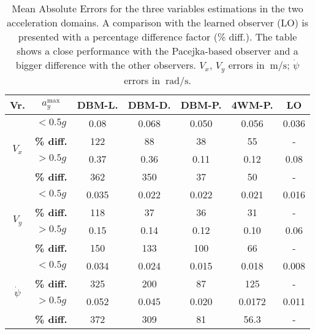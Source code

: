 \documentclass[journal]{IEEEtran}
\begin{document}
\begin{table}[h]
\centering
\caption{Mean Absolute Errors for the three variables estimations in the two acceleration domains. A comparison with the learned observer (LO) is presented with a percentage difference factor (\% diff.). The table shows a close performance with the Pacejka-based observer and a bigger difference with the other observers. $V_x$, $V_y$ errors in $\SI{}{\meter\per\second}$; $\dot\psi$ errors in $\SI{}{\radian\per\second}$.}
\begin{tabular}{ccccccc}
\toprule
\textbf{Vr.} & $a_y^{\text{max}}$ & \textbf{DBM-L.} & \textbf{DBM-D.} & \textbf{DBM-P.} & \textbf{4WM-P.} & \textbf{LO}\\
\midrule
\multirow{4}{*}{$V_x$} & $<0.5g$  & 0.08 & 0.068 & 0.050 & 0.056 & 0.036\\ 
& \textbf{\% diff.} & 122 & 88 & 38 & 55 & -\\
\cmidrule{2-7}
& $>0.5g$ & 0.37 & 0.36 & 0.11 & 0.12 & 0.08\\
& \textbf{\% diff.} & 362 & 350 & 37 & 50 & -\\
\midrule
\multirow{4}{*}{$V_y$} &  $<0.5g$ & 0.035 & 0.022  & 0.022 & 0.021 & 0.016\\
& \textbf{\% diff.} & 118 & 37 & 36 & 31 & - \\
\cmidrule{2-7}
& $>0.5g$ & 0.15 & 0.14 & 0.12 & 0.10 & 0.06 \\
& \textbf{\% diff.} & 150 & 133 & 100 & 66 & - \\
\midrule
\multirow{4}{*}{$\dot{\psi}$} & $<0.5g$ & 0.034 & 0.024 & 0.015 & 0.018 & 0.008\\
& \textbf{\% diff.} & 325 & 200 & 87 &  125 & -\\
\cmidrule{2-7}
& $>0.5g$ & 0.052 & 0.045 & 0.020 & 0.0172 & 0.011 \\
    & \textbf{\% diff.} & 372 & 309 & 81 & 56.3 & -\\
\bottomrule
\end{tabular}

\label{LOComp.tab}
\end{table}
\end{document}
